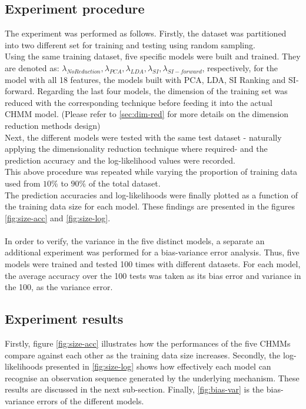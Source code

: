 \subsection{Experiment procedure}
The experiment was performed as follows.
Firstly, the dataset was partitioned into two different set for training and testing using random sampling.\\
Using the same training dataset, five specific models were built and trained. They are denoted as: \(\lambda_{No Reduction}, \lambda_{PCA}, \lambda_{LDA}, \lambda_{SI}, \lambda_{SI-forward}\), respectively, for the model with all 18 features, the models built with PCA, LDA, SI Ranking and SI-forward. Regarding the last four models, the dimension of the training set was reduced with the corresponding technique before feeding it into the actual CHMM model. (Please refer to \ref{sec:dim-red} for more details on the dimension reduction methods design)\\
Next, the different models were tested with the same test dataset - naturally applying the dimensionality reduction technique where required- and the prediction accuracy and the log-likelihood values were recorded.\\
This above procedure was repeated while varying the proportion of training data used from \(10\%\) to \(90\%\) of the total dataset.\\
The prediction accuracies and log-likelihoods were finally plotted as a function of the training data size for each model.
These findings are presented in the figures \ref{fig:size-acc} and \ref{fig:size-log}. \\\\
In order to verify, the variance in the five distinct models, a separate an additional experiment was performed for a bias-variance error analysis. Thus, five models were trained and tested 100 times with different datasets. For each model, the average accuracy over the 100 tests was taken as its bias error and variance in the 100, as the variance error.

\subsection{Experiment results}
Firstly, figure \ref{fig:size-acc} illustrates how the performances of the five CHMMs compare against each other as the training data size increases.
Secondly, the log-likelihoods presented in \ref{fig:size-log} shows how effectively each model can recognise an observation sequence generated by the underlying mechanism. These results are discussed in the next sub-section.
Finally, \ref{fig:bias-var} is the bias-variance errors of the different models.

